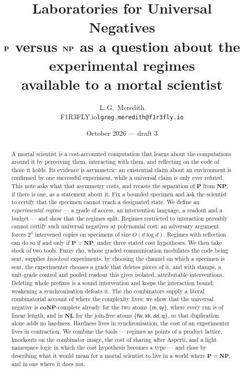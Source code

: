 \documentclass[11pt]{article}
\title{\textbf{Laboratories for Universal Negatives}\\[4pt]
\large $\Pclass$ versus $\NPclass$ as a question about the experimental
regimes\\ available to a mortal scientist}
\author{L.\,G.\ Meredith\\[2pt] \normalsize F1R3FLY.io\quad \texttt{lgreg.meredith@f1r3fly.io}}
\date{October 2026 --- draft 3}
\theoremstyle{definition}
\theoremstyle{plain}
\theoremstyle{remark}
\newcommand{\Pclass}{\mathbf{P}}
\newcommand{\NPclass}{\mathbf{NP}}
\newcommand{\coNP}{\mathbf{coNP}}
\newcommand{\cm}{\mathsf{m}}
\newcommand{\cfw}{\mathsf{fw}}
\newcommand{\cdd}{\mathsf{dd}}
\newcommand{\ckk}{\mathsf{kk}}
\newcommand{\csy}{\mathsf{sy}}
\newcommand{\cq}{\mathsf{q}}
\begin{document}
\maketitle

\begin{abstract}
\noindent
A mortal scientist is a cost-accounted computation that learns about the
computations around it by perceiving them, interacting with them, and
reflecting on the code of those it holds. Its evidence is asymmetric: an
existential claim about an environment is confirmed by one successful
experiment, while a universal claim is only ever refuted. This note asks
what that asymmetry costs, and recasts the separation of $\Pclass$ from
$\NPclass$, if there is one, as a statement about it. Fix a bounded
specimen and ask the scientist to certify that the specimen cannot reach a
designated state. We define an \emph{experimental regime} --- a grade of
access, an intervention language, a readout and a budget --- and show that
the regimes split. Regimes restricted to interaction provably cannot
certify such universal negatives at polynomial cost: an adversary argument
forces $2^d$ intervened copies on specimens of size $O(d \log d)$. Regimes
with reflection can do so if and only if $\Pclass = \NPclass$, under three
stated cost hypotheses. We then take stock of two tools. Fuzzy rho, whose
graded communication modulates the code being sent, supplies
\emph{knockout} experiments: by choosing the channel on which a specimen
is sent, the experimenter chooses a grade that deletes pieces of it, and
with stamps, a unit-grade control and pooled readout this gives isolated,
attributable interventions. Deleting whole prefixes is a sound
intervention and keeps the interaction bound; weakening a
synchronisation defeats it. The rho
combinators supply a literal combinatorial account of where the complexity
lives: we show that the universal negative is $\coNP$-complete already for
the two atoms $\{\cm, \csy\}$, where every run is of linear length, and in
$\mathbf{NL}$ for the join-free atoms $\{\cfw, \ckk, \cdd, \cq\}$, so that
duplication alone adds no hardness. Hardness lives in synchronisation;
the cost of an experimenter lives in contraction. We combine the tools ---
regimes as points of a product lattice, knockouts on the combinator image,
the cost of sharing after Asperti, and a light namespace logic in which
the cost hypothesis becomes a type --- and close by describing what it
would mean for a mortal scientist to live in a world where
$\Pclass = \NPclass$, and in one where it does not.
\end{abstract}
\end{document}
